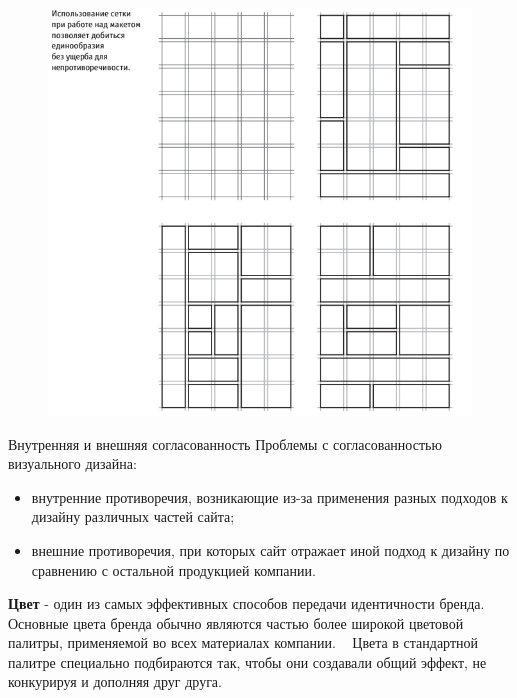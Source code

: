 \documentclass{beamer}
\begin{document}
\begin{frame}[t]
	\begin{figure}[h]
		\centering
		\includegraphics[scale=0.5]{images/lec05-pic03.png}
	\end{figure}
\end{frame}  

\begin{frame}[t]{Внутренняя и внешняя согласованность}
	Проблемы с согласованностью визуального дизайна:
	\begin{itemize}
		\item внутренние противоречия, возникающие из-за применения разных подходов к дизайну различных частей сайта;
		\item внешние противоречия, при которых сайт отражает иной подход к дизайну по сравнению с остальной продукцией компании.
	\end{itemize}
	\textbf{Цвет} - один из самых эффективных способов передачи идентичности бренда.	
	~
	Основные цвета бренда обычно являются частью более широкой цветовой палитры, применяемой во всех материалах компании. 
	~
	Цвета в стандартной палитре специально подбираются так, чтобы они создавали общий эффект, не конкурируя и дополняя друг друга.
\end{frame}
\end{document}
